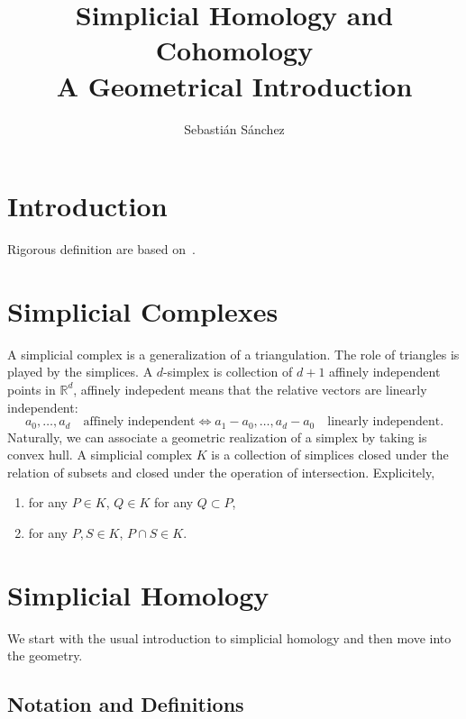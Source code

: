 \documentclass{article}
\title{Simplicial Homology and Cohomology\\ A Geometrical Introduction}
\author{Sebastián Sánchez}
\newcommand{\R}{\mathbb R}
\begin{document}
\maketitle

\section{Introduction}

Rigorous definition are based on~\cite{munkres}.

\section{Simplicial Complexes}

A simplicial complex is a generalization of a triangulation. The role of triangles is
played by the simplices. A \(d\)-simplex is collection of \(d+1\) affinely independent points
in \(\R^{d}\), affinely indepedent means that the relative vectors are linearly independent:
\begin{displaymath}
  a_0, \dots, a_d \quad\textrm{affinely independent}
  \iff
  a_1-a_0, \dots, a_d-a_0 \quad\textrm{linearly independent}.
\end{displaymath}
Naturally, we can associate a geometric realization of a simplex by taking is convex hull.
A simplicial complex \(K\) is a collection of simplices closed under the relation of subsets and 
closed under the operation of intersection. Explicitely,
\begin{enumerate}
  \item for any \(P\in K\), \(Q\in K\) for any \(Q\subset P\),
  \item for any \(P, S\in K\), \(P\cap S \in K\).
\end{enumerate}

\section{Simplicial Homology}

We start with the usual introduction to simplicial homology and then move into
the geometry.

\subsection{Notation and Definitions}
\end{document}
